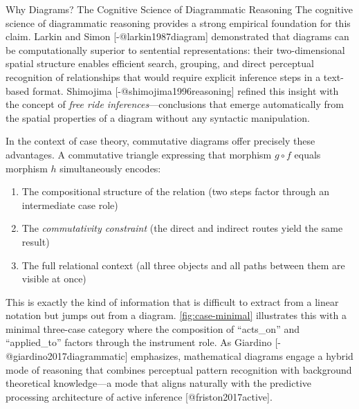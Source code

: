 \documentclass[
  ignorenonframetext,
]{beamer}
\providecommand{\tightlist}{%
  \setlength{\itemsep}{0pt}\setlength{\parskip}{0pt}}
\begin{document}
\begin{frame}{Why Diagrams? The Cognitive Science of Diagrammatic
Reasoning}
\protect{}\label{why-diagrams-the-cognitive-science-of-diagrammatic-reasoning}
The cognitive science of diagrammatic reasoning provides a strong
empirical foundation for this claim. Larkin and Simon
{[}-@larkin1987diagram{]} demonstrated that diagrams can be
computationally superior to sentential representations: their
two-dimensional spatial structure enables efficient search, grouping,
and direct perceptual recognition of relationships that would require
explicit inference steps in a text-based format. Shimojima
{[}-@shimojima1996reasoning{]} refined this insight with the concept of
\emph{free ride inferences}---conclusions that emerge automatically from
the spatial properties of a diagram without any syntactic manipulation.

In the context of case theory, commutative diagrams offer precisely
these advantages. A commutative triangle expressing that morphism
\(g \circ f\) equals morphism \(h\) simultaneously encodes:

\begin{enumerate}
\tightlist
\item
  The compositional structure of the relation (two steps factor through
  an intermediate case role)
\item
  The \emph{commutativity constraint} (the direct and indirect routes
  yield the same result)
\item
  The full relational context (all three objects and all paths between
  them are visible at once)
\end{enumerate}

This is exactly the kind of information that is difficult to extract
from a linear notation but jumps out from a diagram.
\autoref{fig:case-minimal} illustrates this with a minimal three-case
category where the composition of ``acts\_on'' and ``applied\_to''
factors through the instrument role. As Giardino
{[}-@giardino2017diagrammatic{]} emphasizes, mathematical diagrams
engage a hybrid mode of reasoning that combines perceptual pattern
recognition with background theoretical knowledge---a mode that aligns
naturally with the predictive processing architecture of active
inference {[}@friston2017active{]}.


\end{frame}
\end{document}
